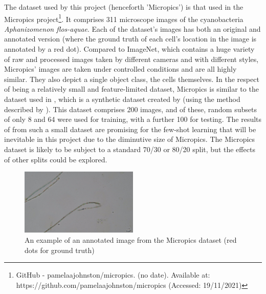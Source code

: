 The dataset used by this project (henceforth 'Micropics') is that used in the Micropics project\footnote{GitHub - pamelaajohnston/micropics. (no date). Available at: https://github.com/pamelaajohnston/micropics (Accessed: 19/11/2021)}. It comprises 311 microscope images of the cyanobacteria \textit{Aphanizomenon flos-aquae}. Each of the dataset's images has both an original and annotated version (where the ground truth of each cell's location in the image is annotated by a red dot). Compared to ImageNet, which contains a huge variety of raw and processed images taken by different cameras and with different styles, Micropics' images are taken under controlled conditions and are all highly similar. They also depict a single object class, the cells themselves. In the respect of being a relatively small and feature-limited dataset, Micropics is similar to the dataset used in \cite{xie2018microscopy}, which is a synthetic dataset created by \cite{Zisserman} (using the method described by \cite{Computational-framework}). This dataset comprises 200 images, and of these, random subsets of only 8 and 64 were used for training, with a further 100 for testing. The results of \cite{xie2018microscopy} from such a small dataset are promising for the few-shot learning that will be inevitable in this project due to the diminutive size of Micropics. The Micropics dataset is likely to be subject to a standard 70/30 or 80/20 split, but the effects of other splits could be explored.\\

\begin{figure}[h!]
	\centering
	\includegraphics[width=0.5\textwidth]{images/02Background/micropics.jpg}
	\caption{An example of an annotated image from the Micropics dataset (red dots for ground truth)}
\end{figure}

